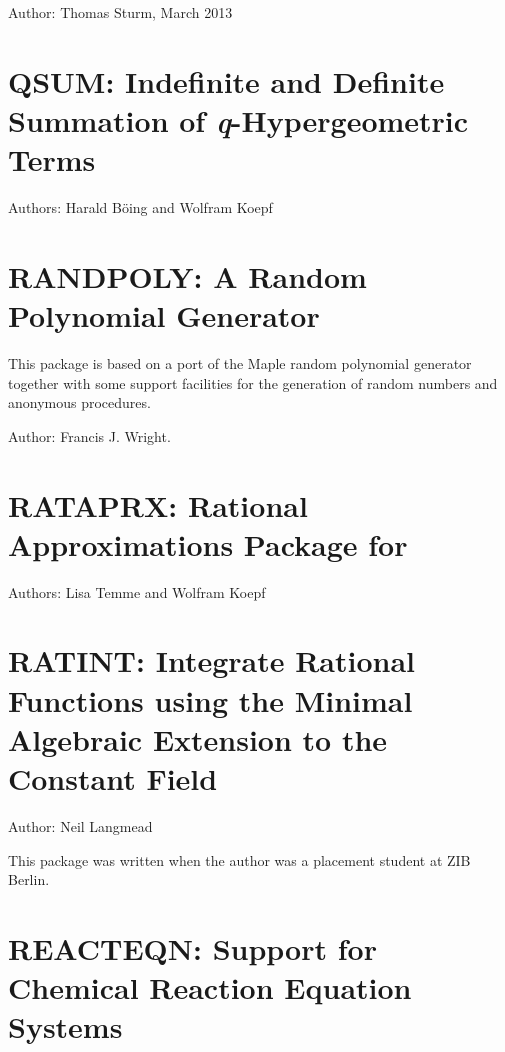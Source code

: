Author: Thomas Sturm, March 2013

\newpage


\section{QSUM: Indefinite and Definite Summation
of \textsl{q}-Hypergeometric Terms}

Authors: Harald B\"{o}ing and Wolfram Koepf



\newpage

\section{RANDPOLY: A Random Polynomial Generator}

This package is based on a port of the Maple random polynomial
generator together with some support facilities for the generation
of random numbers and anonymous procedures.

Author: Francis J. Wright.



\newpage

\section{RATAPRX: Rational Approximations Package for \REDUCE}

Authors: Lisa Temme and Wolfram Koepf



\newpage

\section{RATINT: Integrate Rational Functions using the Minimal Algebraic                                                                                                                           Extension to the Constant Field}

Author: Neil Langmead

This package was written when the author was a placement student at ZIB Berlin.



\newpage

\section{REACTEQN: Support for Chemical Reaction Equation Systems}

